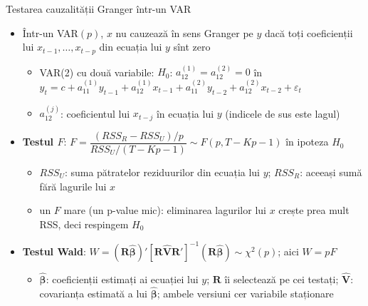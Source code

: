 \begin{frame}{Testarea cauzalității Granger într-un VAR}
\itemsize{\small}
\begin{itemize}
    \item Într-un VAR$(p)$, $x$ nu cauzează în sens Granger pe $y$ dacă toți coeficienții lui $x_{t-1}, \dots, x_{t-p}$ din ecuația lui $y$ sînt zero
    \begin{itemize}
        \item VAR(2) cu două variabile: $H_0$: $a_{12}^{(1)} = a_{12}^{(2)} = 0$ în $y_t = c + a_{11}^{(1)}y_{t-1} + a_{12}^{(1)}x_{t-1} + a_{11}^{(2)}y_{t-2} + a_{12}^{(2)}x_{t-2} + \varepsilon_t$
        \item $a_{12}^{(j)}$: coeficientul lui $x_{t-j}$ în ecuația lui $y$ (indicele de sus este lagul)
    \end{itemize}
    \item \textbf{Testul $F$}: $F = \dfrac{(RSS_R - RSS_U)/p}{RSS_U/(T - Kp - 1)} \sim F(p, T - Kp - 1)$ în ipoteza $H_0$
    \begin{itemize}
        \item $RSS_U$: suma pătratelor reziduurilor din ecuația lui $y$; $RSS_R$: aceeași sumă fără lagurile lui $x$
        \item un $F$ mare (un p-value mic): eliminarea lagurilor lui $x$ crește prea mult RSS, deci respingem $H_0$
    \end{itemize}
    \item \textbf{Testul Wald}: $W = (\mathbf{R}\hat{\boldsymbol{\beta}})'[\mathbf{R}\hat{\mathbf{V}}\mathbf{R}']^{-1}(\mathbf{R}\hat{\boldsymbol{\beta}}) \sim \chi^2(p)$; aici $W = pF$
    \begin{itemize}
        \item $\hat{\boldsymbol{\beta}}$: coeficienții estimați ai ecuației lui $y$; $\mathbf{R}$ îi selectează pe cei testați; $\hat{\mathbf{V}}$: covarianța estimată a lui $\hat{\boldsymbol{\beta}}$; ambele versiuni cer variabile staționare
    \end{itemize}
\end{itemize}
\end{frame}

